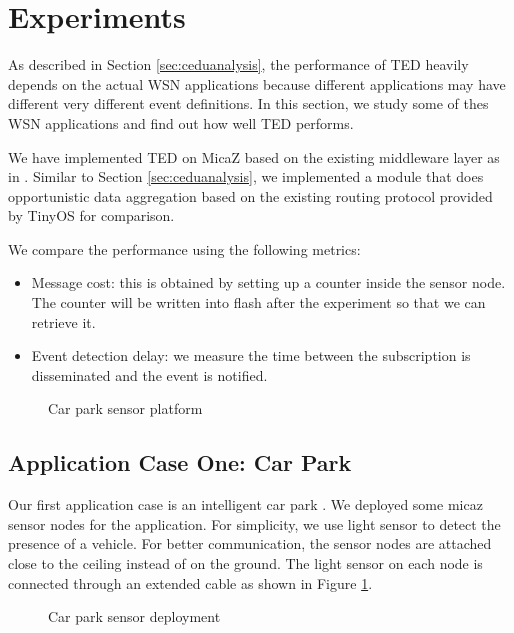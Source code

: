 \section{Experiments}
\label{sec:experiments}
As described in Section \ref{sec:ceduanalysis}, the performance of TED heavily depends on the actual WSN applications because different applications may have different very different event definitions. In this section, we study some of thes WSN applications and find out how well TED performs.

We have implemented TED on MicaZ based on the existing middleware layer as in \cite{lai:psware}. Similar to Section \ref{sec:ceduanalysis}, we implemented a module that does opportunistic data aggregation based on the existing routing protocol provided by TinyOS for comparison.

We compare the performance using the following metrics:
\begin{itemize}
\item Message cost: this is obtained by setting up a counter inside the sensor node. The counter will be written into flash after the experiment so that we can retrieve it.
\item Event detection delay: we measure the time between the subscription is disseminated and the event is notified.
\end{itemize}

\begin{figure}
\centering
{}
\caption{Car park sensor platform}
\label{fig:carParkSensor}
\end{figure}

\subsection{Application Case One: Car Park}
Our first application case is an intelligent car park \cite{tang:carpark}. We deployed some micaz sensor nodes for the application. For simplicity, we use light sensor to detect the presence of a vehicle. For better communication, the sensor nodes are attached close to the ceiling instead of on the ground. The light sensor on each node is connected through an extended cable as shown in Figure \ref{fig:carParkSensor}. 

\begin{figure}
\centering
{}
\caption{Car park sensor deployment}
\label{fig:carParkDeployment}
\end{figure}

